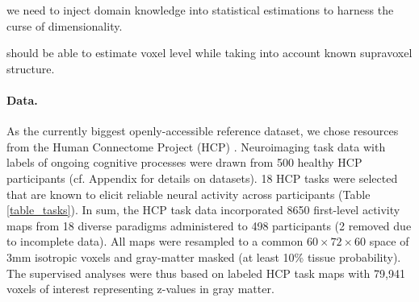\documentclass{article} %
\begin{document}
{we need to inject domain knowledge into
statistical estimations to harness the curse of dimensionality.


should be able to estimate voxel level
while taking into account known supravoxel structure.



%
\paragraph{Data.}
As the currently biggest openly-accessible reference dataset,
we chose resources from the Human Connectome Project (HCP)
\cite{barch2013}.
Neuroimaging task data with labels of ongoing cognitive processes
were drawn from 500
healthy HCP participants (cf. Appendix for details on datasets).
18 HCP tasks 
were selected that are known to elicit reliable neural activity
across participants (Table \ref{table_tasks}).
In sum, the HCP task data incorporated 8650 first-level activity maps
from 18 diverse paradigms administered to 498 participants (2 removed
due to incomplete data).
All maps were resampled to a common $60\times72\times60$ space of
3mm isotropic voxels and gray-matter masked (at least 10\% tissue
probability).
The supervised analyses were thus based on labeled HCP task maps with
79,941 voxels of interest representing z-values in gray matter.

}
\end{document}
